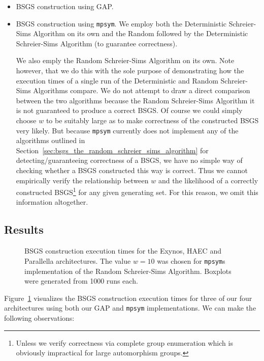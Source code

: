 \begin{itemize}
\item BSGS construction using GAP.

\item BSGS construction using \texttt{mpsym}. We employ both the Deterministic
Schreier-Sims Algorithm on its own and the Random followed by the Deterministic
Schreier-Sims Algorithm (to guarantee correctness).

We also emply the Random Schreier-Sims Algorithm on its own. Note however, that
we do this with the sole purpose of demonstrating how the execution times of a
single run of the Deterministic and Random Schreier-Sims Algorithms compare.
%
We do not attempt to draw a direct comparison between the two algorithms
because the Random Schreier-Sims Algorithm it is not guaranteed to produce a
correct BSGS.
%
Of course we could simply choose $w$ to be suitably large as to make
correctness of the constructed BSGS very likely.
%
But because \texttt{mpsym} currently does not implement any of the algorithms
outlined in Section~\ref{sec:bsgs_the_random_schreier_sims_algorithm} for
detecting/guaranteeing correctness of a BSGS, we have no simple way of checking
whether a BSGS constructed this way is correct. Thus we cannot empirically
verify the relationship between $w$ and the likelihood of a correctly
constructed BSGS\footnote{Unless we verify correctness via complete group
enumeration which is obviously impractical for large automorphism groups.} for
any given generating set. For this reason, we omit this information altogether.
\end{itemize}

\subsection{Results}

\begin{figure}
  \centering
  \caption{BSGS construction execution times for the Exynos, HAEC and
           Parallella architectures. The value $w = 10$ was chosen for
           \texttt{mpsym}s implementation of the Random Schreier-Sims Algorithm.
           Boxplots were generated from 1000 runs each.}
  \label{fig:bsgs_boxplot}
\end{figure}

Figure~\ref{fig:bsgs_boxplot} visualizes the BSGS construction execution times
for three of our four architectures using both our GAP and \texttt{mpsym}
implementations.  We can make the following observations:

